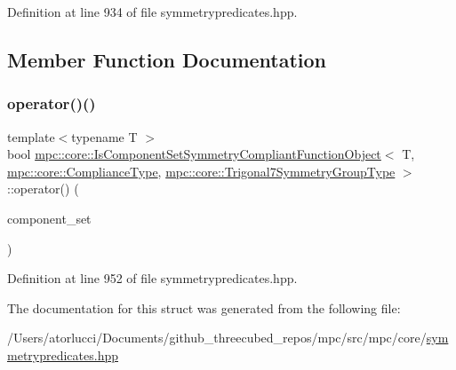 Definition at line 934 of file symmetrypredicates.\+hpp.



\subsection{Member Function Documentation}
\mbox{\label{structmpc_1_1core_1_1_is_component_set_symmetry_compliant_function_object_3_01_t_00_01mpc_1_1corf68b74e952b553f9b8078bf1720fcdd4_aac9a86ac565d872d11630e8d56a0aeb5}} 
\subsubsection{\texorpdfstring{operator()()}{operator()()}}
{\footnotesize\ttfamily template$<$typename T $>$ \\
bool \mbox{\hyperlink{structmpc_1_1core_1_1_is_component_set_symmetry_compliant_function_object}{mpc\+::core\+::\+Is\+Component\+Set\+Symmetry\+Compliant\+Function\+Object}}$<$ T, \mbox{\hyperlink{structmpc_1_1core_1_1_compliance_type}{mpc\+::core\+::\+Compliance\+Type}}, \mbox{\hyperlink{structmpc_1_1core_1_1_trigonal7_symmetry_group_type}{mpc\+::core\+::\+Trigonal7\+Symmetry\+Group\+Type}} $>$\+::operator() (\begin{DoxyParamCaption}\item[{const std\+::set$<$ \mbox{\hyperlink{namespacempc_1_1core_ac3a232afc7c680d580628e834030482f}{mpc\+::core\+::\+Tensor\+Rank4\+Component}}$<$ T $>$ $>$ \&}]{component\+\_\+set }\end{DoxyParamCaption})\hspace{0.3cm}{\ttfamily [inline]}}



Definition at line 952 of file symmetrypredicates.\+hpp.



The documentation for this struct was generated from the following file\+:\begin{DoxyCompactItemize}
\item 
/\+Users/atorlucci/\+Documents/github\+\_\+threecubed\+\_\+repos/mpc/src/mpc/core/\mbox{\hyperlink{symmetrypredicates_8hpp}{symmetrypredicates.\+hpp}}\end{DoxyCompactItemize}
